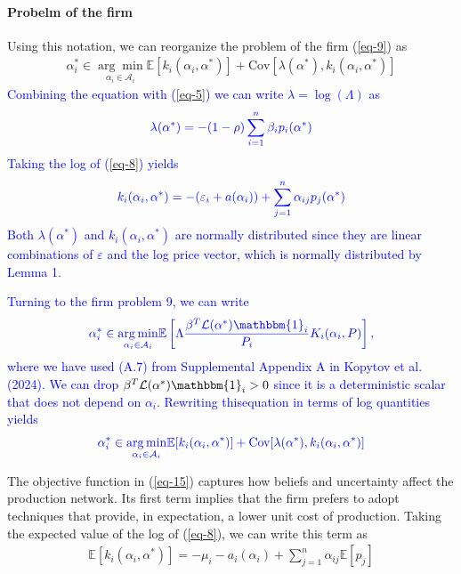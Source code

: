 \documentclass[11pt]{article}
\theoremstyle{definition}
\begin{document}
	\paragraph{Probelm of the firm}
	Using this notation, we can reorganize the problem of the firm (\ref{eq-9}) as
	\begin{align}
		\alpha_i^* \in \underset{\alpha_i\in\mathcal{A}_i}{\arg\min} \mathbb{E}[k_i(\alpha_i, \alpha^*)] + \text{Cov}[\lambda(\alpha^*), k_i(\alpha_i,\alpha^*)] \label{eq-15}
	\end{align}
	\textcolor{blue}{Combining the equation with (\ref{eq-5}) we can write $\lambda = \log(\Lambda)$ as}
	\begin{align*}
		\color{blue}\lambda(\alpha^*) = -(1-\rho) \sum\limits_{i=1}^n \beta_ip_i(\alpha^*)
	\end{align*}
	\textcolor{blue}{Taking the log of (\ref{eq-8}) yields}
	\begin{align*}
		\color{blue} k_i(\alpha_i,\alpha^*) = -(\varepsilon_i + a(\alpha_i)) + \sum\limits_{j=1}^n \alpha_{ij} p_j (\alpha^*)
	\end{align*}
	\textcolor{blue}{Both $\lambda(\alpha^*)$ and $k_i(\alpha_i,\alpha^*)$ are normally distributed since they are linear combinations of $\varepsilon$ and the
	log price vector, which is normally distributed by Lemma 1.}
	
	\textcolor{blue}{Turning to the firm problem 9, we can write}
	\begin{align*}
		\color{blue} \alpha_i^* \in \underset{\alpha_i\in\mathcal{A}_i}{\arg\min} \mathbb{E}\left[\Lambda\frac{\beta^T\mathcal{L}(\alpha^*)\mathbbm{1}_i}{P_i} K_i(\alpha_i, P) \right],
	\end{align*}
	\textcolor{blue}{where we have used (A.7) from Supplemental Appendix A in Kopytov et al.(2024). We can drop $\beta^T\mathcal{L}(\alpha^*)\mathbbm{1}_i>0$ since it is a deterministic scalar that does not depend on $\alpha_i$. Rewriting thisequation in terms of log quantities yields}
	\begin{align*}
		\color{blue} \alpha_i^* \in \underset{\alpha_i\in\mathcal{A}_i}{\arg\min} \mathbb{E}[k_i(\alpha_i, \alpha^*)] + \text{Cov}[\lambda(\alpha^*), k_i(\alpha_i,\alpha^*)]
	\end{align*}
	
	The objective function in (\ref{eq-15}) captures how beliefs and uncertainty affect the production network. Its first term implies that the firm prefers to adopt techniques that provide, in expectation, a lower unit cost of production. Taking the expected value of the log of (\ref{eq-8}), we can write this term as
	\begin{align*}
		\mathbb{E} [k_i(\alpha_i,\alpha^*)] = -\mu_i - a_i(\alpha_i) + \sum\limits_{j=1}^n \alpha_{ij}\mathbb{E}[p_j]
	\end{align*}
	
\end{document}
